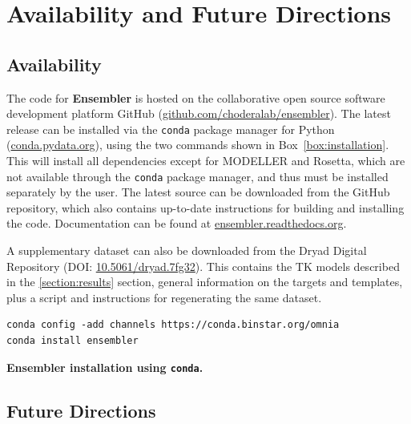 \documentclass[aps,prl,preprint,nofootinbib,superscriptaddress,linenumbers]{revtex4-1}
\begin{document}
\section{Availability and Future Directions}
\label{section:availability}

\subsection*{Availability}

The code for {\bf Ensembler} is hosted on the collaborative open source software development platform GitHub (\href{http://github.com/choderalab/ensembler}{github.com/choderalab/ensembler}).
The latest release can be installed via the {\tt conda} package manager for Python (\href{http://conda.pydata.org}{conda.pydata.org}), using the two commands shown in Box~\ref{box:installation}.
This will install all dependencies except for MODELLER and Rosetta, which are not available through the {\tt conda} package manager, and thus must be installed separately by the user.
The latest source can be downloaded from the GitHub repository, which also contains up-to-date instructions for building and installing the code.
Documentation can be found at \href{http://ensembler.readthedocs.org/en/latest/}{ensembler.readthedocs.org}.

A supplementary dataset can also be downloaded from the Dryad Digital Repository (DOI: \href{https://dx.doi.org/10.5061/dryad.7fg32}{10.5061/dryad.7fg32}).
This contains the TK models described in the \ref{section:results} section, general information on the targets and templates, plus a script and instructions for regenerating the same dataset.

\begin{codebox}[tbp]
\scriptsize
\begin{Verbatim}[frame=single]
conda config -add channels https://conda.binstar.org/omnia
conda install ensembler
\end{Verbatim}
\caption{{\bf \footnotesize Ensembler installation using {\tt conda}.}
}
\label{box:installation}
\end{codebox}

\subsection*{Future Directions}
\end{document}
